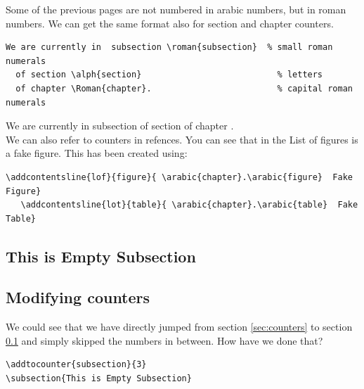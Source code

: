 \documentclass[a4paper,10pt]{report} %
\begin{document}
Some of the previous pages are not numbered in arabic numbers, but in roman numbers. We can get the same format also for section and chapter counters. 

\begin{lstlisting}[language={[latex]tex}, frame=single,basicstyle=\footnotesize]
  We are currently in  subsection \roman{subsection}  % small roman numerals 
  of section \alph{section}                           % letters
  of chapter \Roman{chapter}.                         % capital roman numerals
\end{lstlisting}
 We are currently in  subsection   %
  of section                            %
  of chapter . \\                      %

  We can also refer to counters in refences. You can see that in the List of figures is a fake figure. This has been created using: 
  
  
   \begin{lstlisting}[language={[latex]tex}, frame=single,basicstyle=\footnotesize]
   \addcontentsline{lof}{figure}{ \arabic{chapter}.\arabic{figure}  Fake Figure}
   \addcontentsline{lot}{table}{ \arabic{chapter}.\arabic{table}  Fake Table}
\end{lstlisting}
  

\addtocounter{subsection}{3}
\subsection{This is Empty Subsection}\label{sec:empty}

\subsection{Modifying counters}

We could see that we have directly jumped from section \ref{sec:counters} to section \ref{sec:empty} and simply skipped the numbers in between.
How have we done that?
\begin{lstlisting}[language={[latex]tex},
frame=single,basicstyle=\footnotesize]
\addtocounter{subsection}{3}
\subsection{This is Empty Subsection}  
\end{lstlisting}
\end{document}
